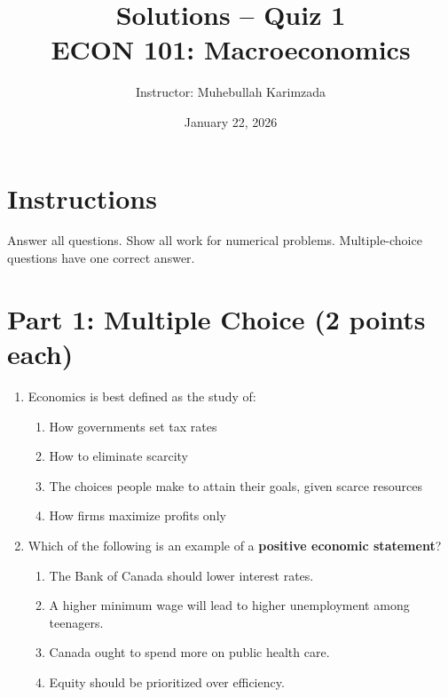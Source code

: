 \documentclass[12pt]{article}
\title{\textbf{Solutions -- Quiz 1} \vspace{ 0.4cm }\\ECON 101: Macroeconomics }
\author{Instructor: Muhebullah Karimzada}
\date{January 22,  2026}
\begin{document}
\maketitle

\section*{Instructions}
Answer all questions. Show all work for numerical problems. Multiple-choice questions have one correct answer.

\section*{Part 1: Multiple Choice (2 points each)}

\begin{enumerate}
    \item Economics is best defined as the study of:
    \begin{enumerate}[label=\Alph*.]
        \item How governments set tax rates  
        \item How to eliminate scarcity  
        \item The choices people make to attain their goals, given scarce resources  
        \item How firms maximize profits only  
    \end{enumerate}

    \item Which of the following is an example of a \textbf{positive economic statement}?  
    \begin{enumerate}[label=\Alph*.]
        \item The Bank of Canada should lower interest rates.  
        \item A higher minimum wage will lead to higher unemployment among teenagers.  
        \item Canada ought to spend more on public health care.  
        \item Equity should be prioritized over efficiency.  
    \end{enumerate}


\end{enumerate}
\end{document}
